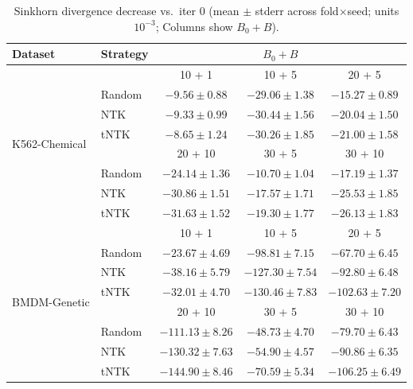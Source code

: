 \begin{table}[ht]
\centering
\small
\caption{Sinkhorn divergence decrease vs.\ iter 0 (mean $\pm$ stderr across fold$\times$seed; units $10^{-3}$; Columns show $B_0 + B$).}
\label{tab:sinkhorn_dec_rf_ntk_tntk_v3}
\begin{tabular}{llccc}
\toprule
Dataset & Strategy & \multicolumn{3}{c}{$B_0 + B$} \\
\midrule
\multirow{8}{*}{K562-Chemical} & & 10 + 1 & 10 + 5 & 20 + 5 \\
\cmidrule(lr){3-5}
 & Random & $\mathbf{-9.56 \pm 0.88}$ & $-29.06 \pm 1.38$ & $-15.27 \pm 0.89$ \\
 & NTK & $-9.33 \pm 0.99$ & $\mathbf{-30.44 \pm 1.56}$ & $-20.04 \pm 1.50$ \\
 & tNTK & $-8.65 \pm 1.24$ & $-30.26 \pm 1.85$ & $\mathbf{-21.00 \pm 1.58}$ \\
\cmidrule(lr){2-5}
 & & 20 + 10 & 30 + 5 & 30 + 10 \\
\cmidrule(lr){3-5}
 & Random & $-24.14 \pm 1.36$ & $-10.70 \pm 1.04$ & $-17.19 \pm 1.37$ \\
 & NTK & $-30.86 \pm 1.51$ & $-17.57 \pm 1.71$ & $-25.53 \pm 1.85$ \\
 & tNTK & $\mathbf{-31.63 \pm 1.52}$ & $\mathbf{-19.30 \pm 1.77}$ & $\mathbf{-26.13 \pm 1.83}$ \\
\midrule
\multirow{8}{*}{BMDM-Genetic} & & 10 + 1 & 10 + 5 & 20 + 5 \\
\cmidrule(lr){3-5}
 & Random & $-23.67 \pm 4.69$ & $-98.81 \pm 7.15$ & $-67.70 \pm 6.45$ \\
 & NTK & $\mathbf{-38.16 \pm 5.79}$ & $-127.30 \pm 7.54$ & $-92.80 \pm 6.48$ \\
 & tNTK & $-32.01 \pm 4.70$ & $\mathbf{-130.46 \pm 7.83}$ & $\mathbf{-102.63 \pm 7.20}$ \\
\cmidrule(lr){2-5}
 & & 20 + 10 & 30 + 5 & 30 + 10 \\
\cmidrule(lr){3-5}
 & Random & $-111.13 \pm 8.26$ & $-48.73 \pm 4.70$ & $-79.70 \pm 6.43$ \\
 & NTK & $-130.32 \pm 7.63$ & $-54.90 \pm 4.57$ & $-90.86 \pm 6.35$ \\
 & tNTK & $\mathbf{-144.90 \pm 8.46}$ & $\mathbf{-70.59 \pm 5.34}$ & $\mathbf{-106.25 \pm 6.49}$ \\
\bottomrule
\end{tabular}
\end{table}
